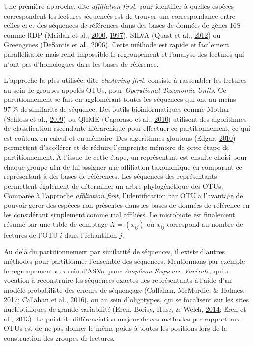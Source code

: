 \documentclass[12pt,a4paper]{reedthesis}
\theoremstyle{definition}
\theoremstyle{definition}
\theoremstyle{definition}
\theoremstyle{remark}
\begin{document}
Une première approche, dite \emph{affiliation first}, pour identifier à quelles espèces correspondent les lectures séquencés est de trouver une correspondance entre celles-ci et des séquences de références dans des bases de données de gènes 16S comme RDP (Maidak et al., \protect\hyperlink{ref-maidak2000rdp}{2000}, \protect\hyperlink{ref-maidak1997rdp}{1997}), SILVA (Quast et al., \protect\hyperlink{ref-quast2012silva}{2012}) ou Greengenes (DeSantis et al., \protect\hyperlink{ref-desantis2006greengenes}{2006}). Cette méthode est rapide et facilement parallélisable mais rend impossible le regroupement et l'analyse des lectures qui n'ont pas d'homologues dans les bases de référence.

L'approche la plus utilisée, dite \emph{clustering first}, consiste à rassembler les lectures au sein de groupes appelés OTUs, pour \emph{Operational Taxonomic Units}. Ce partitionnement se fait en agglomérant toutes les séquences qui ont au moins \(97~\%\) de similarité de séquence. Des outils bioinformatiques comme Mothur (Schloss et al., \protect\hyperlink{ref-schloss2009introducing}{2009}) ou QIIME (Caporaso et al., \protect\hyperlink{ref-caporaso2010qiime}{2010}) utilisent des algorithmes de classification ascendante hiérarchique pour effectuer ce partitionnement, ce qui est coûteux en calcul et en mémoire. Des algorithmes gloutons (Edgar, \protect\hyperlink{ref-edgar2010search}{2010}) permettent d'accélérer et de réduire l'empreinte mémoire de cette étape de partitionnement. À l'issue de cette étape, un représentant est ensuite choisi pour chaque groupe afin de lui assigner une affiliation taxonomique en comparant ce représentant à des bases de références. Les séquences des représentants permettent également de déterminer un arbre phylogénétique des OTUs. Comparée à l'approche \emph{affiliation first}, l'identification par OTU a l'avantage de pouvoir gérer des espèces non présentes dans les bases de données de référence en les considérant simplement comme mal affiliées. Le microbiote est finalement résumé par une table de comptage \(X = (x_{ij})\) où \(x_{ij}\) correspond au nombre de lectures de l'OTU \(i\) dans l'échantillon \(j\).

Au delà du partitionnement par similarité de séquences, il existe d'autres méthodes pour partitionner l'ensemble des séquences. Mentionnons par exemple le regroupement aux sein d'ASVs, pour \emph{Amplicon Sequence Variants}, qui a vocation à reconstruire les séquences exactes des représentants à l'aide d'un modèle probabiliste des erreurs de séquençage (Callahan, McMurdie, \& Holmes, \protect\hyperlink{ref-callahan2017exact}{2017}; Callahan et al., \protect\hyperlink{ref-callahan2016dada2}{2016}), ou au sein d'oligotypes, qui se focalisent sur les sites nucléotidiques de grande variabilité (Eren, Borisy, Huse, \& Welch, \protect\hyperlink{ref-eren2014oligotyping}{2014}; Eren et al., \protect\hyperlink{ref-eren2013oligotyping}{2013}). Le point de différenciation majeur de ces méthodes par rapport aux OTUs est de ne pas donner le même poids à toutes les positions lors de la construction des groupes de lectures.
\end{document}

